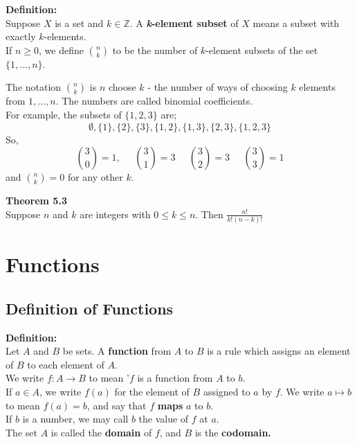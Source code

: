 \documentclass{report}
\newenvironment{frameblue}[1][BlueViolet]
  {\begin{tcolorbox}[colframe=#1,colback=white]}
  {\end{tcolorbox}}
\newenvironment{framered}[1][Maroon]
  {\begin{tcolorbox}[colframe=#1,colback=white]}
  {\end{tcolorbox}}
\begin{document}
\begin{frameblue}
    \textbf{Definition:}\\
    Suppose $X$ is a set and $k \in \mathbb{Z}$. A \textbf{\textit{k}-element subset} of $X$ means a subset with exactly $k$-elements.\\
    If $n \geq 0$, we define $\binom{n}{k}$ to be the number of $k$-element subsets of the set $\{1,...,n\}$.
\end{frameblue}

The notation $\binom{n}{k}$ is $n$ choose $k$ - the number of ways of choosing $k$ elements from $1,...,n$. The numbers are called binomial coefficients.\\

For example, the subsets of $\{1,2,3\}$ are;
\begin{equation*}
     \emptyset, \{ 1 \}, \{2 \}, \{3\}, \{1,2\}, \{1,3\}, \{2,3\}, \{1,2,3\} 
\end{equation*}
So,
\begin{equation*}
    \binom{3}{0} = 1, \; \; \; \; \; \binom{3}{1} = 3  \; \; \; \; \; \binom{3}{2} = 3  \; \; \; \; \; \binom{3}{3} = 1
\end{equation*}
and $\binom{n}{k} = 0$ for any other $k$. 

\begin{framered}
    \textbf{Theorem 5.3}\\
    Suppose $n$ and $k$ are integers with $0 \leq k \leq n$. Then $\frac{n!}{k!(n-k)!}$
\end{framered}

\chapter{Functions}
\section{Definition of Functions}

\begin{frameblue}
    \textbf{Definition:}\\
    Let $A$ and $B$ be sets. A \textbf{function} from $A$ to $B$ is a rule which assigns an element of $B$ to each element of $A$.\\
    We write $f: A \rightarrow B$ to mean '$f$ is a function from $A$ to $b$.\\
    If $a \in A$, we write $f(a)$ for the element of $B$ assigned to $a$ by $f$. We write $a \mapsto b$ to mean $f(a) = b$, and say that $f$ \textbf{maps} $a$ to $b$.\\
    If $b$ is a number, we may call $b$ the value of $f$ at $a$.\\
    The set $A$ is called the \textbf{domain} of $f$, and $B$ is the \textbf{codomain.}
    \end{frameblue}
\end{document}
